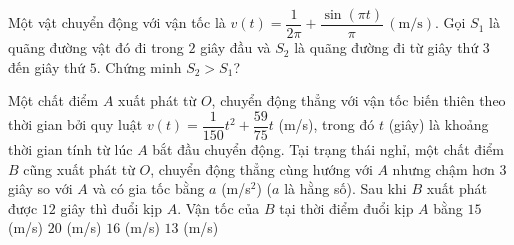 \begin{bt}%
	Một vật chuyển động với vận tốc là $v(t)=\dfrac{1}{2\pi}+\dfrac{\sin (\pi t)}{\pi}\, (\mathrm{m}/\mathrm{s})$. Gọi $S_1$ là quãng đường vật đó đi trong $2$ giây đầu và $S_2$ là quãng  đường đi từ giây thứ $3$ đến giây thứ $5$. Chứng minh $S_2>S_1$?
\end{bt}

\begin{ex}%
	Một chất điểm $A$ xuất phát từ $O$, chuyển động thẳng với vận tốc biến thiên theo thời gian bởi quy luật $v(t)=\dfrac{1}{150}t^2+\dfrac{59}{75}t$ (m/s), trong đó $t$ (giây) là khoảng thời gian tính từ lúc $A$ bắt đầu chuyển động. Tại trạng thái nghỉ, một chất điểm $B$ cũng xuất phát  từ $O$, chuyển động thẳng cùng hướng với $A$ nhưng chậm hơn $3$ giây so với $A$ và có gia tốc bằng $a$ (m/s$^2$) ($a$ là hằng số). Sau khi $B$ xuất phát được $12$ giây thì đuổi kịp $A$. Vận tốc của $B$ tại thời điểm đuổi kịp $A$ bằng
	 \choice
		{$15$ (m/s)} 
		{$20$ (m/s)} 
		{\True $16$ (m/s)} 
		{$13$ (m/s)} 
\end{ex}

